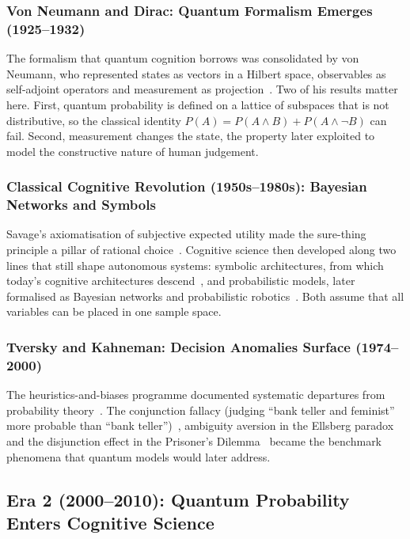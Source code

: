 \documentclass[pdflatex,sn-basic]{sn-jnl}
\begin{document}
\subsubsection{Von Neumann and Dirac: Quantum Formalism Emerges (1925--1932)}
The formalism that quantum cognition borrows was consolidated by von Neumann, who represented states as vectors in a Hilbert space, observables as self-adjoint operators and measurement as projection~\citep{vonNeumann1932}. Two of his results matter here. First, quantum probability is defined on a lattice of subspaces that is not distributive, so the classical identity $P(A) = P(A \wedge B) + P(A \wedge \neg B)$ can fail. Second, measurement changes the state, the property later exploited to model the constructive nature of human judgement.

\subsubsection{Classical Cognitive Revolution (1950s--1980s): Bayesian Networks and Symbols}
Savage's axiomatisation of subjective expected utility made the sure-thing principle a pillar of rational choice~\citep{Savage1954}. Cognitive science then developed along two lines that still shape autonomous systems: symbolic architectures, from which today's cognitive architectures descend~\citep{Kotseruba2020,Laird2017}, and probabilistic models, later formalised as Bayesian networks and probabilistic robotics~\citep{Thrun2005}. Both assume that all variables can be placed in one sample space.

\subsubsection{Tversky and Kahneman: Decision Anomalies Surface (1974--2000)}
The heuristics-and-biases programme documented systematic departures from probability theory~\citep{Tversky1974}. The conjunction fallacy (judging ``bank teller and feminist'' more probable than ``bank teller'')~\citep{Tversky1983}, ambiguity aversion in the Ellsberg paradox~\citep{Ellsberg1961} and the disjunction effect in the Prisoner's Dilemma~\citep{Shafir1992} became the benchmark phenomena that quantum models would later address.

\subsection{Era 2 (2000--2010): Quantum Probability Enters Cognitive Science}\label{sec:era2}
\end{document}
